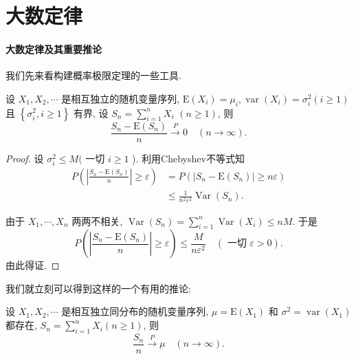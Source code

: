 \section{大数定律}
\paragraph{大数定律及其重要推论}

我们先来看构建概率极限定理的一些工具.

\begin{theorem}[Chebyshev大数律] 
    设 $X_1, X_2, \cdots$ 是相互独立的随机变量序列, $\mathrm{E}\left(X_i\right)=\mu_i, \operatorname{var}\left(X_i\right)=\sigma_i^2(i \geqslant 1)$ 且 $\left\{\sigma_i^2, i \geqslant 1\right\}$ 有界, 设 $S_n=\sum_{i=1}^n X_i$ $(n \geqslant 1)$, 则
$$
\frac{S_n-\mathrm{E}\left(S_n\right)}{n} \stackrel{P}{\longrightarrow} 0 \quad(n \rightarrow \infty) .
$$
\end{theorem}

\begin{proof}
    设 $\sigma_i^2 \leqslant M($ 一切 $i \geqslant 1$ ). 利用Chebyshev不等式知
$$
\begin{aligned}
P\left(\left|\frac{S_n-\mathrm{E}\left(S_n\right)}{n}\right| \geqslant \varepsilon\right) & =P\left(\left|S_n-\mathrm{E}\left(S_n\right)\right| \geqslant n \varepsilon\right) \\
& \leqslant \frac{1}{n^2 \varepsilon^2} \operatorname{Var}\left(S_n\right) .
\end{aligned}
$$

由于 $X_1, \cdots, X_n$ 两两不相关, $\operatorname{Var}\left(S_n\right)=\sum_{i=1}^n \operatorname{Var}\left(X_i\right) \leqslant n M$. 于是
$$
P\left(\left|\frac{S_n-\mathrm{E}\left(S_n\right)}{n}\right| \geqslant \varepsilon\right) \leqslant \frac{M}{n \varepsilon^2} \quad(\text { 一切 } \varepsilon>0) .
$$
由此得证. 

\end{proof}

我们就立刻可以得到这样的一个有用的推论: 

\begin{corollary}
    设 $X_1, X_2, \cdots$ 是相互独立同分布的随机变量序列, $\mu=\mathrm{E}\left(X_1\right)$ 和 $\sigma^2=\operatorname{var}\left(X_1\right)$ 都存在, $S_n=\sum_{i=1}^n X_i(n \geqslant 1)$, 则
    $$
    \frac{S_n}{n} \stackrel{P}{\longrightarrow} \mu \quad(n \rightarrow \infty) .
    $$
\end{corollary}




